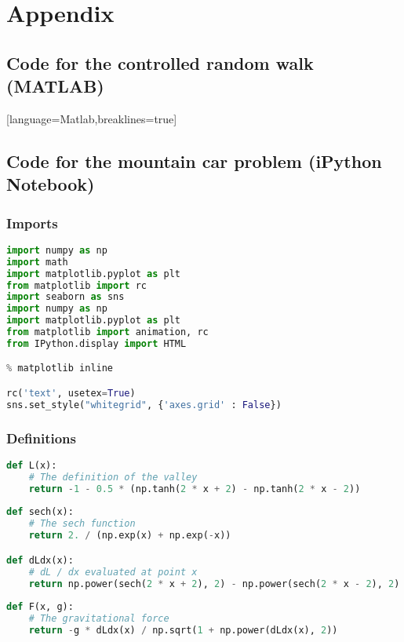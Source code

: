 \documentclass[10pt,a4paper]{article}
\begin{document}
\newpage
\section{Appendix}
\subsection{Code for the controlled random walk (MATLAB)}
[language=Matlab,breaklines=true]

\subsection{Code for the mountain car problem (iPython Notebook)}
\subsubsection{Imports}
\begin{lstlisting}[language=Python]
import numpy as np
import math
import matplotlib.pyplot as plt
from matplotlib import rc
import seaborn as sns
import numpy as np
import matplotlib.pyplot as plt
from matplotlib import animation, rc
from IPython.display import HTML

% matplotlib inline

rc('text', usetex=True)
sns.set_style("whitegrid", {'axes.grid' : False})
\end{lstlisting}

\subsubsection{Definitions}
\begin{lstlisting}[language=Python]
def L(x):
    # The definition of the valley
    return -1 - 0.5 * (np.tanh(2 * x + 2) - np.tanh(2 * x - 2))
    
def sech(x):
    # The sech function
    return 2. / (np.exp(x) + np.exp(-x))

def dLdx(x):
    # dL / dx evaluated at point x
    return np.power(sech(2 * x + 2), 2) - np.power(sech(2 * x - 2), 2)
    
def F(x, g):
    # The gravitational force
    return -g * dLdx(x) / np.sqrt(1 + np.power(dLdx(x), 2))
\end{lstlisting}
\end{document}
